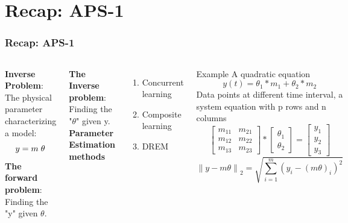 \documentclass[10pt,hyperref={pdfpagelabels=false}]{beamer}
\begin{document}
\section{Recap: APS-1}
\begin{frame}[fragile]
\frametitle{Recap: APS-1}
    \begin{columns}[c] %

\textbf{Inverse Problem}:\\
The physical parameter characterizing a model:
\begin{equation*}
    y=m\hspace{0.1cm}\theta
\end{equation*}
\textbf{The forward problem}: Finding the "y" given $\theta$.

\textbf{The Inverse  problem}: Finding the "$\theta$" given y.
\textbf{Parameter Estimation methods}
\begin{enumerate}
    \item Concurrent learning
    \item Composite learning
    \item DREM
\end{enumerate}

\begin{block}{Example}
A quadratic equation
\begin{equation*}
    y(t)=\theta_1*m_1+\theta_2*m_2 
\end{equation*}
Data points at different time interval, a system equation with p rows and n columns
\begin{equation*}
    \begin{bmatrix}
m_{11} &m_{21} \\ 
m_{12} & m_{22}\\
m_{13} &m_{23}
\end{bmatrix}*\begin{bmatrix}
\theta_1\\ 
\theta_2
\end{bmatrix}=\begin{bmatrix}
y_1\\ 
y_2\\ 
y_3
\end{bmatrix}
\end{equation*}
\begin{equation*}
    \left \| y-m\theta \right \|_2=\sqrt{\sum_{i=1}^{m}(y_i-(m\theta)_i)^2}
\end{equation*}
\end{block}
\end{columns}
\end{frame}
\end{document}
